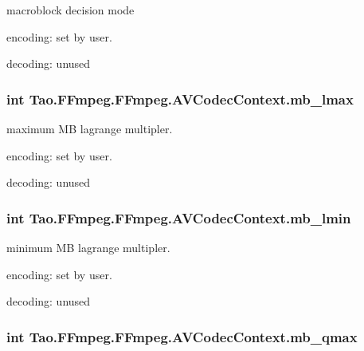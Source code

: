 \label{struct_tao_1_1_f_fmpeg_1_1_f_fmpeg_1_1_a_v_codec_context_aa1415ee4b953c21e30ebcc8f87716f2f}
macroblock decision mode
\begin{DoxyItemize}
\item encoding: set by user.
\item decoding: unused 
\end{DoxyItemize}\hypertarget{struct_tao_1_1_f_fmpeg_1_1_f_fmpeg_1_1_a_v_codec_context_a1a6ed6ecae4c82114f1f54d4d4a71b97}{
\subsubsection[{mb\_\-lmax}]{\setlength{\rightskip}{0pt plus 5cm}int {\bf Tao.FFmpeg.FFmpeg.AVCodecContext.mb\_\-lmax}}}
\label{struct_tao_1_1_f_fmpeg_1_1_f_fmpeg_1_1_a_v_codec_context_a1a6ed6ecae4c82114f1f54d4d4a71b97}
maximum MB lagrange multipler.
\begin{DoxyItemize}
\item encoding: set by user.
\item decoding: unused 
\end{DoxyItemize}\hypertarget{struct_tao_1_1_f_fmpeg_1_1_f_fmpeg_1_1_a_v_codec_context_a1c86ad19c332a736fc03b0b6718198bc}{
\subsubsection[{mb\_\-lmin}]{\setlength{\rightskip}{0pt plus 5cm}int {\bf Tao.FFmpeg.FFmpeg.AVCodecContext.mb\_\-lmin}}}
\label{struct_tao_1_1_f_fmpeg_1_1_f_fmpeg_1_1_a_v_codec_context_a1c86ad19c332a736fc03b0b6718198bc}
minimum MB lagrange multipler.
\begin{DoxyItemize}
\item encoding: set by user.
\item decoding: unused 
\end{DoxyItemize}\hypertarget{struct_tao_1_1_f_fmpeg_1_1_f_fmpeg_1_1_a_v_codec_context_a5c1e7dbf1459fb72b8dabf983cf4c27a}{
\subsubsection[{mb\_\-qmax}]{\setlength{\rightskip}{0pt plus 5cm}int {\bf Tao.FFmpeg.FFmpeg.AVCodecContext.mb\_\-qmax}}}
